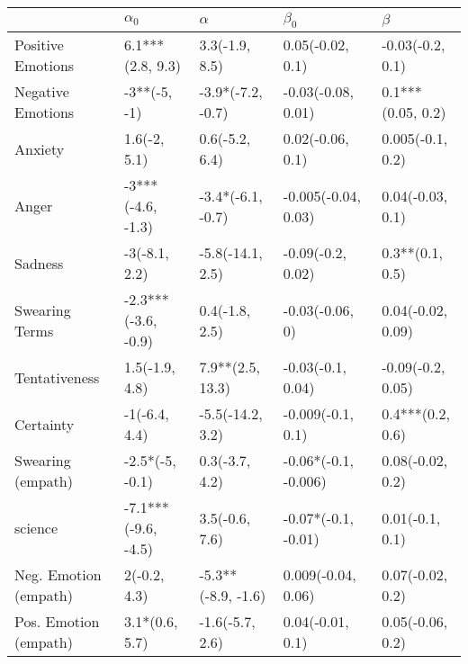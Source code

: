 \begin{tabular}{lllll}
\toprule
{} &           $\alpha_0$ &            $\alpha$ &             $\beta_0$ &            $\beta$ \\
\midrule
Positive Emotions     &     6.1***(2.8, 9.3) &      3.3(-1.9, 8.5) &      0.05(-0.02, 0.1) &   -0.03(-0.2, 0.1) \\
Negative Emotions     &         -3**(-5, -1) &   -3.9*(-7.2, -0.7) &    -0.03(-0.08, 0.01) &  0.1***(0.05, 0.2) \\
Anxiety               &         1.6(-2, 5.1) &      0.6(-5.2, 6.4) &      0.02(-0.06, 0.1) &   0.005(-0.1, 0.2) \\
Anger                 &    -3***(-4.6, -1.3) &   -3.4*(-6.1, -0.7) &   -0.005(-0.04, 0.03) &   0.04(-0.03, 0.1) \\
Sadness               &        -3(-8.1, 2.2) &    -5.8(-14.1, 2.5) &     -0.09(-0.2, 0.02) &    0.3**(0.1, 0.5) \\
Swearing Terms        &  -2.3***(-3.6, -0.9) &      0.4(-1.8, 2.5) &       -0.03(-0.06, 0) &  0.04(-0.02, 0.09) \\
Tentativeness         &       1.5(-1.9, 4.8) &    7.9**(2.5, 13.3) &     -0.03(-0.1, 0.04) &  -0.09(-0.2, 0.05) \\
Certainty             &        -1(-6.4, 4.4) &    -5.5(-14.2, 3.2) &     -0.009(-0.1, 0.1) &   0.4***(0.2, 0.6) \\
Swearing (empath)     &      -2.5*(-5, -0.1) &      0.3(-3.7, 4.2) &  -0.06*(-0.1, -0.006) &   0.08(-0.02, 0.2) \\
science               &  -7.1***(-9.6, -4.5) &      3.5(-0.6, 7.6) &   -0.07*(-0.1, -0.01) &    0.01(-0.1, 0.1) \\
Neg. Emotion (empath) &         2(-0.2, 4.3) &  -5.3**(-8.9, -1.6) &    0.009(-0.04, 0.06) &   0.07(-0.02, 0.2) \\
Pos. Emotion (empath) &       3.1*(0.6, 5.7) &     -1.6(-5.7, 2.6) &      0.04(-0.01, 0.1) &   0.05(-0.06, 0.2) \\
\bottomrule
\end{tabular}
